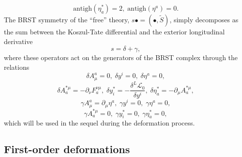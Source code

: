 \documentclass[a4paper,12pt]{article}
\begin{document}
\begin{equation}
\mathrm{antigh}\left( \eta _{a}^{*}\right) =
2,\;\mathrm{antigh}\left( \eta
^{a}\right) =0.  \label{4.3c}
\end{equation}
The BRST symmetry of the ``free'' theory, $s\bullet =
\left( \bullet ,\tilde{S%
}\right) $, simply decomposes as the
sum between the Koszul-Tate
differential and the exterior longitudinal derivative
\begin{equation}
s=\delta +\gamma ,  \label{4.4}
\end{equation}
where these operators act on the generators of
the BRST complex through the
relations 
\begin{equation}
\delta A_{\mu }^{a}=0,\;\delta y^{i}=
0,\;\delta \eta ^{a}=0,  \label{4.5}
\end{equation}
\begin{equation}
\delta A_{a}^{*\mu }=
-\partial _{\nu }F_{a}^{\nu \mu },\;\delta y_{i}^{*}=-%
\frac{\delta ^{L}{\mathcal{L}}_{0}}{\delta y^{i}},
\;\delta \eta _{a}^{*}=
-\partial _{\mu }A_{a}^{*\mu },  \label{4.6}
\end{equation}
\begin{equation}
\gamma A_{\mu }^{a}=
\partial _{\mu }\eta ^{a},\;\gamma y^{i}=0,\;\gamma \eta
^{a}=0,  \label{4.7}
\end{equation}
\begin{equation}
\gamma A_{a}^{*\mu }=0,\;\gamma y_{i}^{*}=
0,\;\gamma \eta _{a}^{*}=0,
\label{4.8}
\end{equation}
which will be used in the sequel during
the deformation process.

\subsection{First-order deformations}
\end{document}
